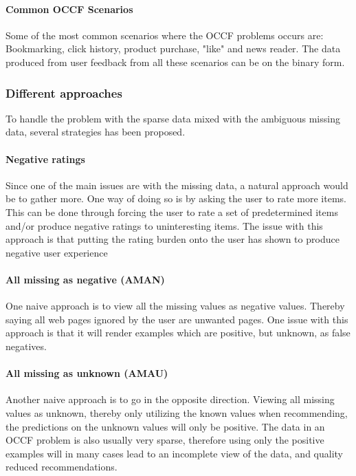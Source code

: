 \paragraph{Common OCCF Scenarios}

Some of the most common scenarios where the OCCF problems occurs are:
Bookmarking, click history, product purchase, "like" and news reader.  The data
produced from user feedback from all these scenarios can be on the binary form.

\subsubsection{Different approaches}

To handle the problem with the sparse data mixed with the ambiguous missing
data, several strategies has been proposed.

\paragraph{Negative ratings}

Since one of the main issues are with the missing data, a natural approach
would be to gather more.  One way of doing so is by asking the user to rate
more items.  This can be done through forcing the user to rate a set of
predetermined items and/or produce negative ratings to uninteresting items.
The issue with this approach is that putting the rating burden onto the user
has shown to produce negative user
experience~\cite{Kelly:2003:IFI:959258.959260}

\paragraph{All missing as negative (AMAN)}

One naive approach is to view all the missing values as negative values.
Thereby saying all web pages ignored by the user are unwanted pages.  One issue
with this approach is that it will render examples which are positive, but
unknown, as false negatives.

\paragraph{All missing as unknown (AMAU)}

Another naive approach is to go in the opposite direction.  Viewing all missing
values as unknown, thereby only utilizing the known values when recommending,
the predictions on the unknown values will only be positive.  The data in an
OCCF problem is also usually very sparse, therefore using only the positive
examples will in many cases lead to an incomplete view of the data, and quality
reduced recommendations.

